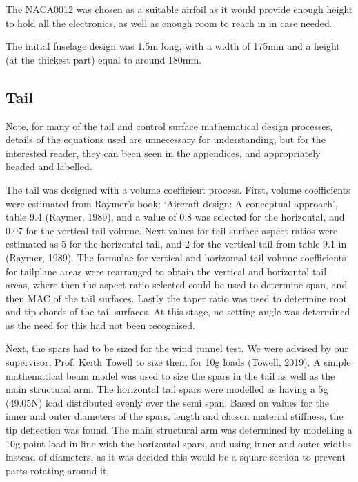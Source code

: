 \documentclass[../../main.tex]{subfiles}
\begin{document}
The NACA0012 was chosen as a suitable airfoil as it would provide enough height to hold all the electronics, as well as enough room to reach in in case needed. 

The initial fuselage design was 1.5m long, with a width of 175mm and a height (at the thickest part) equal to around 180mm. 

\subsection{Tail} \label{sec:design-process:initial-designs:tail}

Note, for many of the tail and control surface mathematical design processes, details of the equations used are unnecessary for understanding, but for the interested reader, they can been seen in the appendices, and appropriately headed and labelled. 

The tail was designed with a volume coefficient process.
First, volume coefficients were estimated from Raymer’s book: ‘Aircraft design: A conceptual approach’, table 9.4 (Raymer, 1989), and a value of 0.8 was selected for the horizontal, and 0.07 for the vertical tail volume.
Next values for tail surface aspect ratios were estimated as 5 for the horizontal tail, and 2 for the vertical tail from table 9.1 in (Raymer, 1989).
The formulae for vertical and horizontal tail volume coefficients for tailplane areas were rearranged to obtain the vertical and horizontal tail areas, where then the aspect ratio selected could be used to determine span, and then MAC of the tail surfaces.
Lastly the taper ratio was used to determine root and tip chords of the tail surfaces.
At this stage, no setting angle was determined as the need for this had not been recognised. 

Next, the spars had to be sized for the wind tunnel test.
We were advised by our supervisor, Prof. Keith Towell to size them for 10g loads (Towell, 2019).
A simple mathematical beam model was used to size the spars in the tail as well as the main structural arm.
The horizontal tail spars were modelled as having a 5g (49.05N) load distributed evenly over the semi span.
Based on values for the inner and outer diameters of the spars, length and chosen material stiffness, the tip deflection was found.
The main structural arm was determined by modelling a 10g point load in line with the horizontal spars, and using inner and outer widths instead of diameters, as it was decided this would be a square section to prevent parts rotating around it.
\end{document}
